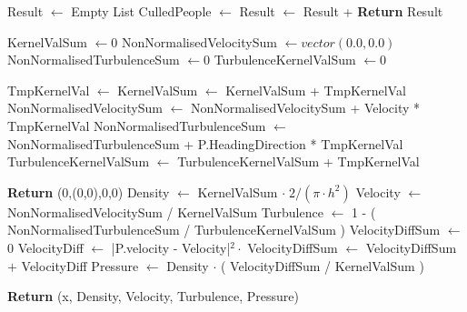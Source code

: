 \begin{center}
\label{alg:revised_algorithm}
\begin{algorithmic}[1]

\State Result $\gets$ Empty List 
    \State CulledPeople $\gets$  
    \State Result $\gets$ Result + 
\EndFor
\State \textbf{Return} Result

\EndFunction



\State KernelValSum $\gets 0$
\State NonNormalisedVelocitySum $\gets vector(0.0,0.0)$
\State NonNormalisedTurbulenceSum $\gets 0$
\State TurbulenceKernelValSum $\gets 0$ 


    \State TmpKernelVal $\gets$ 
    \State KernelValSum $\gets$ KernelValSum + TmpKernelVal
    \State NonNormalisedVelocitySum $\gets$ NonNormalisedVelocitySum + Velocity * TmpKernelVal
        \State NonNormalisedTurbulenceSum $\gets$ NonNormalisedTurbulenceSum + P.HeadingDirection * TmpKernelVal
        \State TurbulenceKernelValSum $\gets$ TurbulenceKernelValSum + TmpKernelVal
    \EndIf
\EndFor

    \State \textbf{Return} (0,(0,0),0,0)
\Else
    \State Density $\gets$ KernelValSum $\cdot \; 2 / (\pi \cdot h^2)$
    \State Velocity $\gets$ NonNormalisedVelocitySum / KernelValSum
    \State Turbulence $\gets$ 1 - ( NonNormalisedTurbulenceSum / TurbulenceKernelValSum )
    \State VelocityDiffSum $\gets$ 0
        \State VelocityDiff $\gets$ |P.velocity - Velocity|$^2 \cdot$ 
        \State VelocityDiffSum $\gets$ VelocityDiffSum $+$ VelocityDiff
    \EndFor
    \State Pressure $\gets$ Density $\cdot$ ( VelocityDiffSum / KernelValSum )



\State \textbf{Return} (x, Density, Velocity, Turbulence, Pressure)
\EndIf
\EndFunction
\end{algorithmic}
\end{center}






